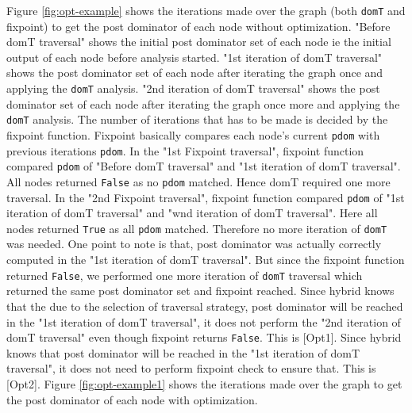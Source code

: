 Figure \ref{fig:opt-example} shows the iterations made over the graph (both \lstinline|domT| and fixpoint) to get the post dominator of each node without optimization. "Before domT traversal" shows the initial post dominator set of each node ie the initial output of each node before analysis started. "1st iteration of domT traversal" shows the post dominator set of each node after iterating the graph once and applying the \lstinline|domT| analysis. "2nd iteration of domT traversal" shows the post dominator set of each node after iterating the graph once more and applying the \lstinline|domT| analysis. The number of iterations that has to be made is decided by the fixpoint function. Fixpoint basically compares each node's current \lstinline|pdom| with previous iterations \lstinline|pdom|. In the "1st Fixpoint traversal", fixpoint function compared \lstinline|pdom| of "Before domT traversal" and "1st iteration of domT traversal". All nodes returned \lstinline|False| as no \lstinline|pdom| matched. Hence domT required one more traversal. In the "2nd Fixpoint traversal", fixpoint function compared \lstinline|pdom| of "1st iteration of domT traversal" and "wnd iteration of domT traversal". Here all nodes returned \lstinline|True| as all \lstinline|pdom| matched. Therefore no more iteration of \lstinline|domT| was needed. One point to note is that, post dominator was actually correctly computed in the "1st iteration of domT traversal". But since the fixpoint function returned \lstinline|False|, we performed one more iteration of \lstinline|domT| traversal which returned the same post dominator set and fixpoint reached.\newline
Since hybrid knows that the due to the selection of traversal strategy, post dominator will be reached in the "1st iteration of domT traversal", it does not perform the "2nd iteration of domT traversal" even though fixpoint returns \lstinline|False|. This is [Opt1].\newline
Since hybrid knows that post dominator will be reached in the "1st iteration of domT traversal", it does not need to perform fixpoint check to ensure that. This is [Opt2].
Figure \ref{fig:opt-example1} shows the iterations made over the graph to get the post dominator of each node with optimization. 
